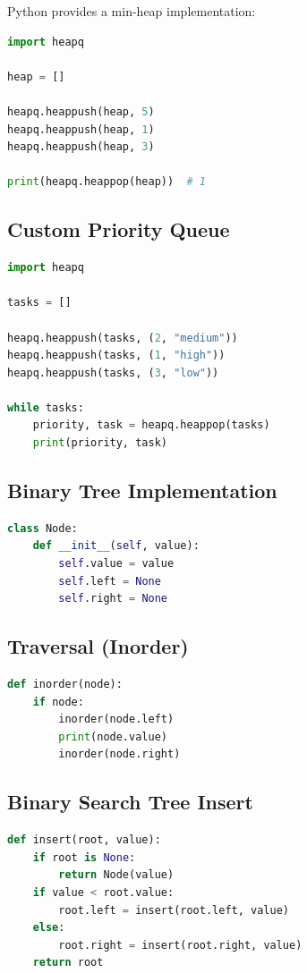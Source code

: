 \documentclass[12pt,oneside]{book}
\numberwithin{equation}{section}
\theoremstyle{definition}
\theoremstyle{plain}
\theoremstyle{remark}
\begin{document}
Python provides a min-heap implementation:

\begin{lstlisting}[language=Python]
import heapq

heap = []

heapq.heappush(heap, 5)
heapq.heappush(heap, 1)
heapq.heappush(heap, 3)

print(heapq.heappop(heap))  # 1
\end{lstlisting}

\subsection{Custom Priority Queue}

\begin{lstlisting}[language=Python]
import heapq

tasks = []

heapq.heappush(tasks, (2, "medium"))
heapq.heappush(tasks, (1, "high"))
heapq.heappush(tasks, (3, "low"))

while tasks:
    priority, task = heapq.heappop(tasks)
    print(priority, task)
\end{lstlisting}

\subsection{Binary Tree Implementation}

\begin{lstlisting}[language=Python]
class Node:
    def __init__(self, value):
        self.value = value
        self.left = None
        self.right = None
\end{lstlisting}

\subsection{Traversal (Inorder)}

\begin{lstlisting}[language=Python]
def inorder(node):
    if node:
        inorder(node.left)
        print(node.value)
        inorder(node.right)
\end{lstlisting}

\subsection{Binary Search Tree Insert}

\begin{lstlisting}[language=Python]
def insert(root, value):
    if root is None:
        return Node(value)
    if value < root.value:
        root.left = insert(root.left, value)
    else:
        root.right = insert(root.right, value)
    return root
\end{lstlisting}
\end{document}
